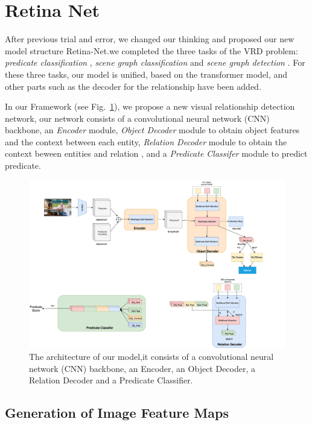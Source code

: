 \section{Retina Net}
\label{sec:retinanet}
After previous trial and error, we changed our thinking and proposed our new model structure Retina-Net.we completed the three tasks of the VRD problem: \textit{predicate classification} , \textit{scene graph classification} and \textit{scene graph detection} . For these three tasks, our model is unified, based on the transformer model, and other parts such as the decoder for the relationship have been added.

In our Framework (see Fig.~\ref{fig:my_model}), we propose a new visual relationship detection network, our network consists of a convolutional neural network (CNN) backbone, an \textit{Encoder} module, \textit{Object Decoder} module to obtain object features and  the context between each entity, \textit{Relation Decoder} module to obtain the context beween entities and relation  , and a \textit{Predicate Classifer} module to predict predicate.

\begin{figure}[!htbp]
	\centering
	\includegraphics[width = 1\textwidth]{figures/my_model.png}
	\caption[The architecture of our model.]
	{The architecture of our model,it consists of a convolutional neural network (CNN) backbone, an Encoder, an Object Decoder, a Relation Decoder and a Predicate Classifier.}
	\label{fig:my_model}
\end{figure}


\subsection{Generation of Image Feature Maps }

